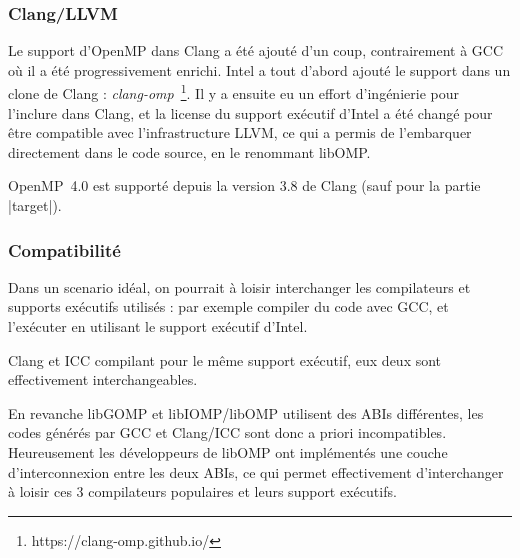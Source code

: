 \subsubsection{Clang/LLVM}

Le support d'OpenMP dans Clang a été ajouté d'un coup, contrairement à GCC où il a été progressivement enrichi.
Intel a tout d'abord ajouté le support dans un clone de Clang : \emph{clang-omp}~\footnote{https://clang-omp.github.io/}.
Il y a ensuite eu un effort d'ingénierie pour l'inclure dans Clang, et la license du support exécutif d'Intel a été changé pour être compatible avec l'infrastructure LLVM, ce qui a permis de l'embarquer directement dans le code source, en le renommant libOMP.

OpenMP~4.0 est supporté depuis la version 3.8 de Clang (sauf pour la partie |target|).

\subsubsection{Compatibilité}

Dans un scenario idéal, on pourrait à loisir interchanger les compilateurs et supports exécutifs utilisés : par exemple compiler du code avec GCC, et l'exécuter en utilisant le support exécutif d'Intel.

Clang et ICC compilant pour le même support exécutif, eux deux sont effectivement interchangeables.

En revanche libGOMP et libIOMP/libOMP utilisent des ABIs différentes, les codes générés par GCC et Clang/ICC sont donc a priori incompatibles.
Heureusement les développeurs de libOMP ont implémentés une couche d'interconnexion entre les deux ABIs, ce qui permet effectivement d'interchanger à loisir ces 3 compilateurs populaires et leurs support exécutifs.
